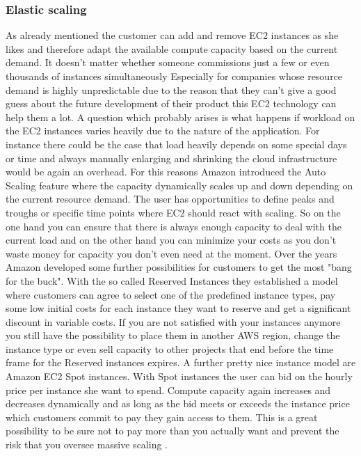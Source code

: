 \subsubsection{Elastic scaling}
As already mentioned the customer can add and remove EC2 instances as she likes and therefore adapt the available compute capacity based on the current demand. It doesn't matter whether someone commissions just a few or even thousands of instances simultaneously \cite{AWS_Overview} Especially for companies whose resource demand is highly unpredictable due to the reason that they can't give a good guess about the future development of their product this EC2 technology can help them a lot. A question which probably arises is what happens if workload on the EC2 instances varies heavily due to the nature of the application. For instance there could be the case that load heavily depends on some special days or time and always manually enlarging and shrinking the cloud infrastructure would be again an overhead. For this reasons Amazon introduced the Auto Scaling feature where the capacity dynamically scales up and down depending on the current resource demand. The user has opportunities to define peaks and troughs or specific time points where EC2 should react with scaling. So on the one hand you can ensure that there is always enough capacity to deal with the current load and on the other hand you can minimize your costs as you don't waste money for capacity you don't even need at the moment. Over the years Amazon developed some further possibilities for customers to get the most "bang for the buck". With the so called Reserved Instances they established a model where customers can agree to select one of the predefined instance types, pay some low initial costs for each instance they want to reserve and get a significant discount in variable costs. If you are not satisfied with your instances anymore you still have the possibility to place them in another AWS region, change the instance type or even sell capacity to other projects that end before the time frame for the Reserved instances expires. A further pretty nice instance model are Amazon EC2 Spot instances. With Spot instances the user can bid on the hourly price per instance she want to spend. Compute capacity again increases and decreases dynamically and as long as the bid meets or exceeds the instance price which customers commit to pay they gain access to them. This is a great possibility to be sure not to pay more than you actually want and prevent the risk that you oversee massive scaling \cite{AWS_Overview}.


